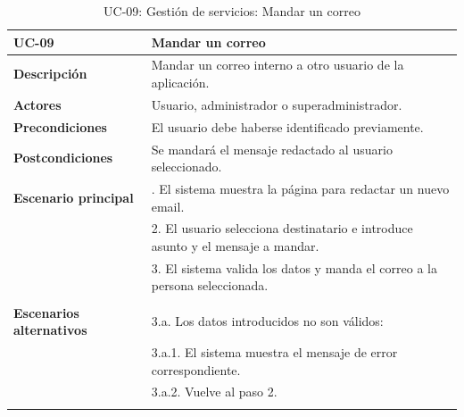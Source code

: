 \begin{table}[H]
  \begin{center}
    \begin{tabularx}{16.4cm}{|l|X|}
      \hline
      \textbf{UC-09} & \textbf{Mandar un correo}\\
      \hline
      \textbf{Descripción} & Mandar un correo interno a otro usuario de la aplicación.\\
      \hline
      \textbf{Actores} & Usuario, administrador o superadministrador.\\
      \hline
      \textbf{Precondiciones} & El usuario debe haberse identificado previamente.\\
      \hline
      \textbf{Postcondiciones} & Se mandará el mensaje redactado al usuario seleccionado.\\
      \hline
      \textbf{Escenario principal} & \smallskip 1. El sistema muestra la página para redactar un nuevo email.\\
      & 2. El usuario selecciona destinatario e introduce asunto y el mensaje a mandar.\\
      & 3. El sistema valida los datos y manda el correo a la persona seleccionada.\\
      & \\
      \hline
      \textbf{Escenarios alternativos} & \smallskip 3.a. Los datos introducidos no son válidos:\\
      & \hspace{0.3cm} 3.a.1. El sistema muestra el mensaje de error correspondiente.\\
      & \hspace{0.3cm} 3.a.2. Vuelve al paso 2.\\
      & \\
      \hline
    \end{tabularx}
    \caption{UC-09: Gestión de servicios: Mandar un correo}
    \label{tab:CU-mandar-correo}
  \end{center}
\end{table}


